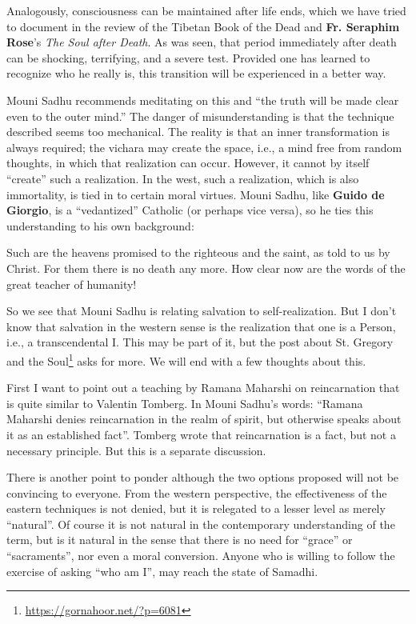 Analogously, consciousness can be maintained after life ends, which we have tried to document in the review of the Tibetan Book of the Dead and \textbf{Fr. Seraphim Rose}'s \textit{The Soul after Death}. As was seen, that period immediately after death can be shocking, terrifying, and a severe test. Provided one has learned to recognize who he really is, this transition will be experienced in a better way.

Mouni Sadhu recommends meditating on this and ``the truth will be made clear even to the outer mind.'' The danger of misunderstanding is that the technique described seems too mechanical. The reality is that an inner transformation is always required; the vichara may create the space, i.e., a mind free from random thoughts, in which that realization can occur. However, it cannot by itself ``create'' such a realization. In the west, such a realization, which is also immortality, is tied in to certain moral virtues. Mouni Sadhu, like \textbf{Guido de Giorgio}, is a ``vedantized'' Catholic (or perhaps vice versa), so he ties this understanding to his own background:

\begin{quotex}
Such are the heavens promised to the righteous and the saint, as told to us by Christ. For them there is no death any more. How clear now are the words of the great teacher of humanity!
\end{quotex}


So we see that Mouni Sadhu is relating salvation to self-realization. But I don't know that salvation in the western sense is the realization that one is a Person, i.e., a transcendental I. This may be part of it, but the post about St. Gregory and the Soul\footnote{\url{https://gornahoor.net/?p=6081}} asks for more. We will end with a few thoughts about this.

First I want to point out a teaching by Ramana Maharshi on reincarnation that is quite similar to Valentin Tomberg. In Mouni Sadhu's words: ``Ramana Maharshi denies reincarnation in the realm of spirit, but otherwise speaks about it as an established fact''. Tomberg wrote that reincarnation is a fact, but not a necessary principle. But this is a separate discussion.

There is another point to ponder although the two options proposed will not be convincing to everyone. From the western perspective, the effectiveness of the eastern techniques is not denied, but it is relegated to a lesser level as merely ``natural''. Of course it is not natural in the contemporary understanding of the term, but is it natural in the sense that there is no need for ``grace'' or ``sacraments'', nor even a moral conversion. Anyone who is willing to follow the exercise of asking ``who am I'', may reach the state of Samadhi.

